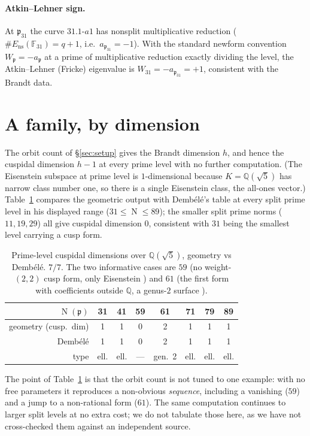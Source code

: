 \documentclass[11pt,a4paper]{article}
\newcommand{\Q}{\mathbb{Q}}
\newcommand{\F}{\mathbb{F}}
\newcommand{\fp}{\mathfrak{p}}
\DeclareMathOperator{\Nm}{N}
\begin{document}
\paragraph{Atkin--Lehner sign.}
\sloppy At $\fp_{31}$ the curve $31.1\text{-}a1$ has nonsplit multiplicative
reduction ($\#E_{\mathrm{ns}}(\F_{31})=q+1$, i.e.\ $a_{\fp_{31}}=-1$).
With the standard newform convention $W_\fp=-a_\fp$ at a prime of
multiplicative reduction exactly dividing the level, the Atkin--Lehner
(Fricke) eigenvalue is $W_{31}=-a_{\fp_{31}}=+1$, consistent with the
Brandt data.

\section{A family, by dimension}\label{sec:dims}

The orbit count of \S\ref{sec:setup} gives the Brandt dimension $h$, and
hence the cuspidal dimension $h-1$ at every prime level with no further
computation. (The Eisenstein subspace at prime level is $1$-dimensional
because $K=\Q(\sqrt5)$ has narrow class number one, so there is a single
Eisenstein class, the all-ones vector.) Table~\ref{tab:dims} compares
the geometric output with Demb\'el\'e's table \cite{Dembele2005} at
every split prime level in his displayed range ($31\le\Nm\le89$); the
smaller split prime norms ($11,19,29$) all give cuspidal dimension $0$,
consistent with $31$ being the smallest level carrying a cusp form.

\begin{table}[ht]
\centering
\begin{tabular}{r|ccccccc}
\toprule
$\Nm(\fp)$ & 31 & 41 & 59 & 61 & 71 & 79 & 89\\
\midrule
geometry (cusp.\ dim) & 1 & 1 & 0 & 2 & 1 & 1 & 1\\
Demb\'el\'e \cite{Dembele2005} & 1 & 1 & 0 & 2 & 1 & 1 & 1\\
type & ell. & ell. & --- & gen.~2 & ell. & ell. & ell.\\
\bottomrule
\end{tabular}
\caption{Prime-level cuspidal dimensions over $\Q(\sqrt5)$, geometry vs
Demb\'el\'e. $7/7$. The two informative cases are $59$ (no
weight-$(2,2)$ cusp form, only Eisenstein \cite[Ex.~3.6]{Dembele2005})
and $61$ (the first form with coefficients outside $\Q$, a genus-$2$
surface \cite[Rem.~4.4]{Dembele2005}).}
\label{tab:dims}
\end{table}

The point of Table~\ref{tab:dims} is that the orbit count is not tuned
to one example: with no free parameters it reproduces a non-obvious
\emph{sequence}, including a vanishing ($59$) and a jump to a
non-rational form ($61$). The same computation continues to larger
split levels at no extra cost; we do not tabulate those here, as we have
not cross-checked them against an independent source.
\end{document}
